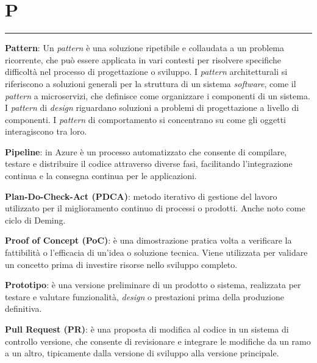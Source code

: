 \section*{P}
{\color{lightgray}\rule{\textwidth}{0.4pt}} %
\begin{glossaryitemize}
    \item \textbf{Pattern}: Un \textit{pattern} è una soluzione ripetibile e collaudata a un problema ricorrente, che può essere applicata in vari contesti per risolvere specifiche difficoltà nel processo di progettazione o sviluppo.  I \textit{pattern} architetturali si riferiscono a soluzioni generali per la struttura di un sistema \textit{software}, come il \textit{pattern} a microservizi, che definisce come organizzare i componenti di un sistema. I \textit{pattern} di \textit{design} riguardano soluzioni a problemi di progettazione a livello di componenti. I \textit{pattern} di comportamento si concentrano su come gli oggetti interagiscono tra loro.
    \item \textbf{Pipeline}: in Azure è un processo automatizzato che consente di compilare, testare e distribuire il codice attraverso diverse fasi, facilitando l'integrazione continua e la consegna continua per le applicazioni.
    \item \textbf{Plan-Do-Check-Act (PDCA)}: metodo iterativo di gestione del lavoro utilizzato per il miglioramento continuo di processi o prodotti. Anche noto come ciclo di Deming.
    \item \textbf{Proof of Concept (PoC)}: è una dimostrazione pratica volta a verificare la fattibilità o l'efficacia di un'idea o soluzione tecnica. Viene utilizzata per validare un concetto prima di investire risorse nello sviluppo completo.
    \item \textbf{Prototipo}: è una versione preliminare di un prodotto o sistema, realizzata per testare e valutare funzionalità, \textit{design} o prestazioni prima della produzione definitiva.
    \item \textbf{Pull Request (PR)}: è una proposta di modifica al codice in un sistema di controllo versione, che consente di revisionare e integrare le modifiche da un ramo a un altro, tipicamente dalla versione di sviluppo alla versione principale.
\end{glossaryitemize}

